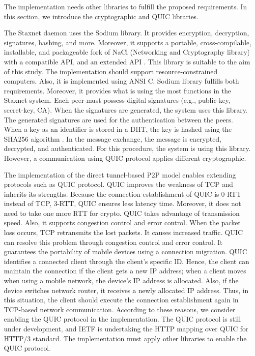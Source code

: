 The implementation needs other libraries to fulfill the proposed requirements. In this section, we introduce the cryptographic and QUIC libraries.

The Staxnet daemon uses the Sodium library. It provides encryption, decryption, signatures, hashing, and more. Moreover, it supports a portable, cross-compilable, installable, and packageable fork of NaCl (Networking and Cryptography library) with a compatible API, and an extended API \cite{Libsodium}. This library is suitable to the aim of this study. The implementation should support resource-constrained computers. Also, it is implemented using ANSI C. Sodium library fulfills both requirements. Moreover, it provides what is using the most functions in the Staxnet system. Each peer must possess digital signatures (e.g., public-key, secret-key, CA). When the signatures are generated, the system uses this library. The generated signatures are used for the authentication between the peers. When a key as an identifier is stored in a DHT, the key is hashed using the SHA256 algorithm \cite{menezes2018handbook}. In the message exchange, the message is encrypted, decrypted, and authenticated. For this procedure, the system is using this library. However, a communication using QUIC protocol applies different cryptographic.

The implementation of the direct tunnel-based P2P model enables extending protocols such as QUIC protocol. QUIC improves the weakness of TCP and inherits its strengths. Because the connection establishment of QUIC is 0-RTT instead of TCP, 3-RTT, QUIC ensures less latency time. Moreover, it does not need to take one more RTT for crypto. QUIC takes advantage of transmission speed. Also, it supports congestion control and error control. When the packet loss occurs, TCP retransmits the lost packets. It causes increased traffic. QUIC can resolve this problem through congestion control and error control. It guarantees the portability of mobile devices using a connection migration. QUIC identifies a connected client through the client's specific ID. Hence, the client can maintain the connection if the client gets a new IP address; when a client moves when using a mobile network, the device's IP address is allocated. Also, if the device switches network router, it receives a newly allocated IP address. Thus, in this situation, the client should execute the connection establishment again in TCP-based network communication. According to these reasons, we consider enabling the QUIC protocol in the implementation. The QUIC protocol is still under development, and IETF is undertaking the HTTP mapping over QUIC for HTTP/3 standard. The implementation must apply other libraries to enable the QUIC protocol.

